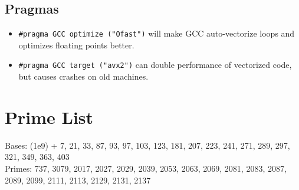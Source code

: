 	\subsection{Pragmas}
		\begin{itemize}
			\item \lstinline{#pragma GCC optimize ("Ofast")} will make GCC auto-vectorize loops and optimizes floating points better.
			\item \lstinline{#pragma GCC target ("avx2")} can double performance of vectorized code, but causes crashes on old machines.
		\end{itemize}


\section{Prime List}
Bases: (1e9) + 7, 21, 33, 87, 93, 97, 103, 123, 181, 207, 223, 241, 271, 289, 297, 321, 349, 363, 403\\
Primes: 737, 3079, 2017, 2027, 2029, 2039, 2053, 2063, 2069, 2081, 2083, 2087, 2089, 2099, 2111, 2113, 2129, 2131, 2137